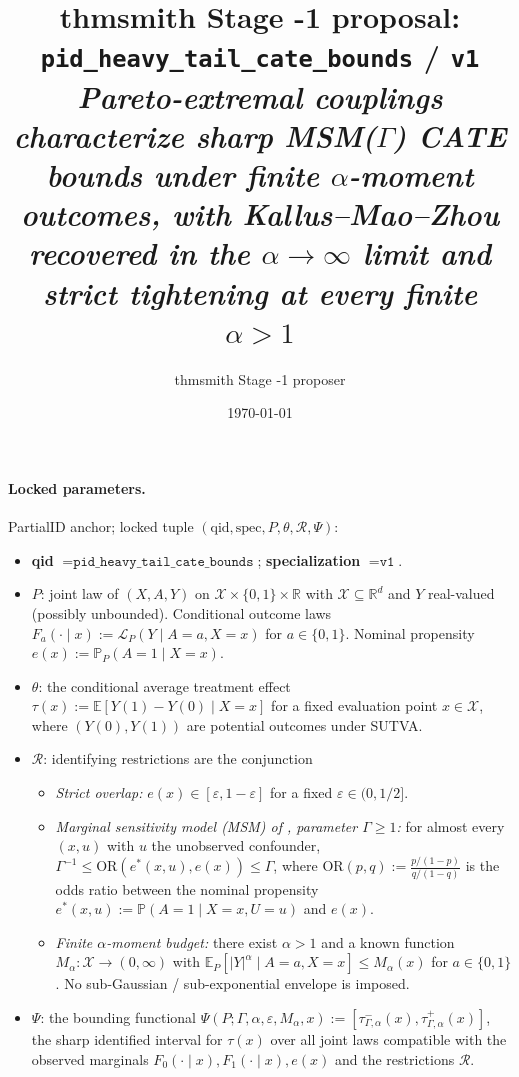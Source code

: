 \documentclass[11pt]{article}
\title{thmsmith Stage -1 proposal: \texttt{pid\_heavy\_tail\_cate\_bounds} / \texttt{v1}%
  \\ \large\textit{Pareto-extremal couplings characterize sharp MSM($\Gamma$) CATE bounds under finite $\alpha$-moment outcomes, with Kallus--Mao--Zhou recovered in the $\alpha\to\infty$ limit and strict tightening at every finite $\alpha>1$}}
\author{thmsmith Stage -1 proposer}
\date{\today}
\newcommand{\E}{\mathbb{E}}
\renewcommand{\Pr}{\mathbb{P}}
\newcommand{\R}{\mathbb{R}}
\theoremstyle{definition}
\theoremstyle{plain}
\theoremstyle{remark}
\begin{document}
\maketitle


\paragraph{Locked parameters.}
PartialID anchor; locked tuple
\((\text{qid}, \text{spec}, P, \theta, \mathcal{R}, \Psi)\):
\begin{itemize}[leftmargin=1.4em,itemsep=0pt]
  \item \textbf{qid} \(= \texttt{pid\_heavy\_tail\_cate\_bounds}\); \textbf{specialization} \(= \texttt{v1}\).
  \item \(P\): joint law of \((X, A, Y)\) on \(\mathcal{X}\times\{0,1\}\times\R\) with \(\mathcal{X}\subseteq\R^d\) and \(Y\) real-valued (possibly unbounded). Conditional outcome laws \(F_a(\cdot\mid x) := \mathcal{L}_P(Y \mid A=a, X=x)\) for \(a\in\{0,1\}\). Nominal propensity \(e(x) := \Pr_P(A=1\mid X=x)\).
  \item \(\theta\): the conditional average treatment effect \(\tau(x) := \E[Y(1)-Y(0)\mid X=x]\) for a fixed evaluation point \(x\in\mathcal{X}\), where \((Y(0),Y(1))\) are potential outcomes under SUTVA.
  \item \(\mathcal{R}\): identifying restrictions are the conjunction
    \begin{itemize}[leftmargin=1.4em,itemsep=0pt]
      \item \emph{Strict overlap:} \(e(x) \in [\varepsilon, 1-\varepsilon]\) for a fixed \(\varepsilon \in (0, 1/2]\).
      \item \emph{Marginal sensitivity model (MSM) of \cite{Tan2006MSM}, parameter \(\Gamma\ge 1\):} for almost every \((x, u)\) with \(u\) the unobserved confounder, \(\Gamma^{-1} \le \mathrm{OR}(e^*(x,u), e(x)) \le \Gamma\), where \(\mathrm{OR}(p,q) := \frac{p/(1-p)}{q/(1-q)}\) is the odds ratio between the nominal propensity \(e^*(x,u) := \Pr(A=1\mid X=x, U=u)\) and \(e(x)\).
      \item \emph{Finite \(\alpha\)-moment budget:} there exist \(\alpha>1\) and a known function \(M_\alpha:\mathcal{X}\to(0,\infty)\) with \(\E_P[|Y|^\alpha \mid A=a, X=x] \le M_\alpha(x)\) for \(a\in\{0,1\}\). No sub-Gaussian / sub-exponential envelope is imposed.
    \end{itemize}
  \item \(\Psi\): the bounding functional \(\Psi(P; \Gamma, \alpha, \varepsilon, M_\alpha, x) := [\tau^-_{\Gamma,\alpha}(x), \tau^+_{\Gamma,\alpha}(x)]\), the sharp identified interval for \(\tau(x)\) over all joint laws compatible with the observed marginals \(F_0(\cdot\mid x), F_1(\cdot\mid x), e(x)\) and the restrictions \(\mathcal{R}\).
\end{itemize}
\end{document}
